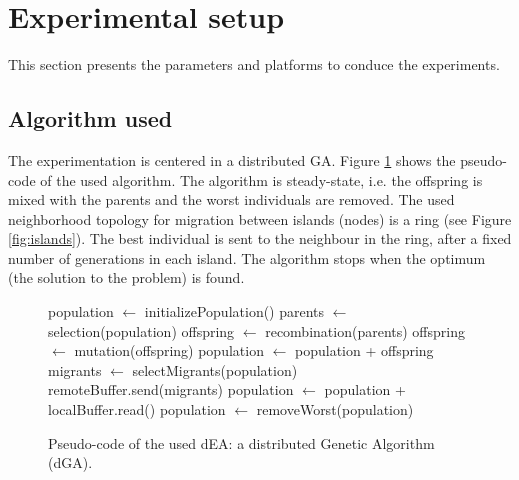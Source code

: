 \documentclass[final,1p,times]{elsarticle}
\begin{document}
\section{Experimental setup}
\label{sec:experiments}
This section presents the parameters and platforms to conduce the experiments. 



\subsection{Algorithm used}
The experimentation is centered in a distributed GA. Figure \ref{fig:EA} shows the pseudo-code of the used algorithm. %
The algorithm is steady-state, i.e. the offspring is mixed with the parents and the worst individuals are removed. The used neighborhood topology for migration between islands (nodes) is a ring (see Figure \ref{fig:islands}). The best individual is sent to the neighbour in the ring, after a fixed number of generations in each island. The algorithm stops when the optimum (the solution to the problem) is found.  %



\begin{figure}[htb]

\begin{algorithmic}
\STATE population $\gets$ initializePopulation()
    \STATE parents $\gets$ selection(population)
    \STATE offspring $\gets$ recombination(parents)
    \STATE offspring $\gets$ mutation(offspring)
    \STATE population $\gets$ population + offspring
      \STATE migrants $\gets$ selectMigrants(population)
      \STATE remoteBuffer.send(migrants)
    \ENDIF
      \STATE population $\gets$ population + localBuffer.read()
    \ENDIF
    \STATE population $\gets$ removeWorst(population)
\ENDWHILE

\end{algorithmic}
\caption{Pseudo-code of the used dEA: a distributed Genetic Algorithm (dGA).}
\label{fig:EA}
\end{figure}
\end{document}
